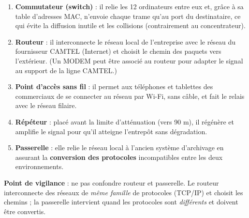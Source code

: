 \documentclass[11pt]{article}
\newcommand{\cle}[1]{{\popxbold\color{popdark}#1}}
\begin{document}
\begin{corrige}
\begin{enumerate}
  \item \textbf{\cle{Commutateur} (switch)} : il relie les 12 ordinateurs entre eux et, grâce à sa table d'adresses MAC, n'envoie chaque trame qu'au port du destinataire, ce qui évite la diffusion inutile et les collisions (contrairement au concentrateur).
  \item \textbf{\cle{Routeur}} : il interconnecte le réseau local de l'entreprise avec le réseau du fournisseur CAMTEL (Internet) et choisit le chemin des paquets vers l'extérieur. (Un \cle{MODEM} peut être associé au routeur pour adapter le signal au support de la ligne CAMTEL.)
  \item \textbf{\cle{Point d'accès sans fil}} : il permet aux téléphones et tablettes des commerciaux de se connecter au réseau par Wi-Fi, sans câble, et fait le relais avec le réseau filaire.
  \item \textbf{\cle{Répéteur}} : placé avant la limite d'atténuation (vers 90 m), il régénère et amplifie le signal pour qu'il atteigne l'entrepôt sans dégradation.
  \item \textbf{\cle{Passerelle}} : elle relie le réseau local à l'ancien système d'archivage en assurant la \textbf{conversion des protocoles} incompatibles entre les deux environnements.
\end{enumerate}
\textbf{Point de vigilance} : ne pas confondre \cle{routeur} et \cle{passerelle}. Le routeur interconnecte des réseaux de \emph{même famille} de protocoles (TCP/IP) et choisit les chemins ; la passerelle intervient quand les protocoles sont \emph{différents} et doivent être convertis.
\end{corrige}
\end{document}
